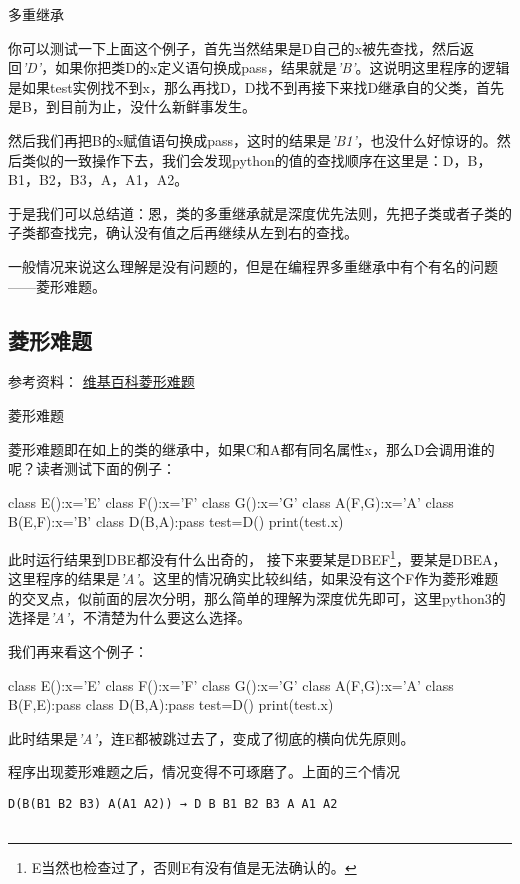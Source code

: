 \documentclass[12pt,oneside]{book}
\begin{document}
\begin{common-format}
\begin{fig}{多重继承}
\caption{多重继承}
\label{fig:多重继承}
\end{fig}

你可以测试一下上面这个例子，首先当然结果是D自己的x被先查找，然后返回\emph{'D'}，如果你把类D的x定义语句换成pass，结果就是\emph{'B'}。这说明这里程序的逻辑是如果test实例找不到x，那么再找D，D找不到再接下来找D继承自的父类，首先是B，到目前为止，没什么新鲜事发生。

然后我们再把B的x赋值语句换成pass，这时的结果是\emph{'B1'}，也没什么好惊讶的。然后类似的一致操作下去，我们会发现python的值的查找顺序在这里是：D，B，B1，B2，B3，A，A1，A2。

于是我们可以总结道：恩，类的多重继承就是深度优先法则，先把子类或者子类的子类都查找完，确认没有值之后再继续从左到右的查找。


一般情况来说这么理解是没有问题的，但是在编程界多重继承中有个有名的问题——菱形难题。

\subsection{菱形难题}
参考资料： \href{http://en.wikipedia.org/wiki/Multiple_inheritance#The_diamond_problem}{维基百科菱形难题}

\begin{fig}{菱形难题}
\caption{菱形难题}
\label{fig:菱形难题}
\end{fig}

菱形难题即在如上的类的继承中，如果C和A都有同名属性x，那么D会调用谁的呢？读者测试下面的例子：
\begin{tcbpython}[]
class E():x='E'
class F():x='F'
class G():x='G'
class A(F,G):x='A'
class B(E,F):x='B'
class D(B,A):pass
test=D()
print(test.x)
\end{tcbpython}
此时运行结果到DBE都没有什么出奇的， 接下来要某是DBEF\footnote{E当然也检查过了，否则E有没有值是无法确认的。}，要某是DBEA，这里程序的结果是\emph{'A'}。这里的情况确实比较纠结，如果没有这个F作为菱形难题的交叉点，似前面的层次分明，那么简单的理解为深度优先即可，这里python3的选择是\emph{'A'}，不清楚为什么要这么选择。

我们再来看这个例子：
\begin{tcbpython}[]
class E():x='E'
class F():x='F'
class G():x='G'
class A(F,G):x='A'
class B(F,E):pass
class D(B,A):pass
test=D()
print(test.x)
\end{tcbpython}
此时结果是\emph{'A'}，连E都被跳过去了，变成了彻底的横向优先原则。

程序出现菱形难题之后，情况变得不可琢磨了。上面的三个情况
\begin{Verbatim}
D(B(B1 B2 B3) A(A1 A2)) → D B B1 B2 B3 A A1 A2


\end{Verbatim}
\end{common-format}
\end{document}
